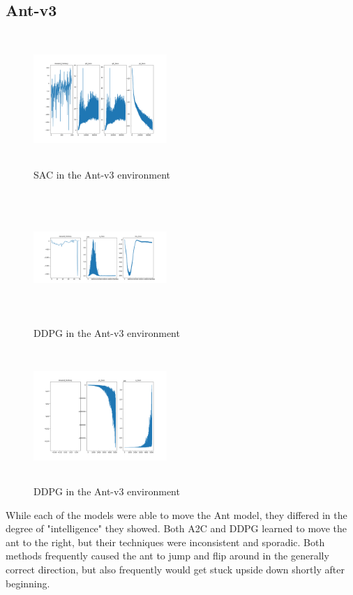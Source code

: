 \documentclass[conference]{IEEEtran}
\begin{document}
\subsection{Ant-v3}

\begin{figure}
    \includegraphics[width=0.45\textwidth, height=5cm]{sac-ant}
    \caption{SAC in the Ant-v3 environment}
\end{figure}

\begin{figure}
    \includegraphics[width=0.45\textwidth, height=5cm]{ddpg-ant}
    \caption{DDPG in the Ant-v3 environment}
\end{figure}

\begin{figure}
    \includegraphics[width=0.45\textwidth, height=5cm]{a2c-ant}
    \caption{DDPG in the Ant-v3 environment}
\end{figure}



While each of the models were able to move the Ant model, they differed in the degree of "intelligence" they showed. Both A2C and DDPG learned to move the ant to the right, but their techniques were inconsistent and sporadic. Both methods frequently caused the ant to jump and flip around in the generally correct direction, but also frequently would get stuck upside down shortly after beginning.
\end{document}

